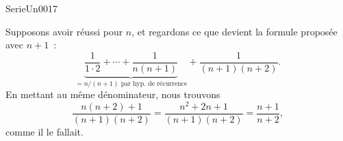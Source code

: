 

\begin{corrige}{SerieUn0017}

	Supposons avoir réussi pour $n$, et regardons ce que devient la formule proposée avec $n+1$~:
	\begin{equation}
		\underbrace{\frac{1}{ 1\cdot 2}+\cdots+\frac{1}{ n(n+1) }}_{\text{$=n/(n+1)$ par hyp. de récurrence}}+\frac{1}{ (n+1)(n+2) }.
	\end{equation}
	En mettant au même dénominateur, nous trouvons
	\begin{equation}
		\frac{ n(n+2)+1 }{ (n+1)(n+2) }=\frac{ n^2+2n+1 }{ (n+1)(n+2) }=\frac{ n+1 }{ n+2 },
	\end{equation}
	comme il le fallait.

\end{corrige}
